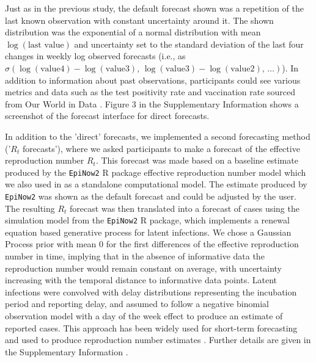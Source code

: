 \documentclass[10pt,a4paper,twocolumn]{article}
\begin{document}
Just as in the previous study, the default forecast shown was a repetition of the last known observation with constant uncertainty around it. The shown distribution was the exponential of a normal distribution with mean $\log (\text{last value})$ and uncertainty set to the standard deviation of the last four changes in weekly log observed forecasts (i.e., as $\sigma(\log(\text{value4}) - \log(\text{value3}), \, \log(\text{value3}) - \log(\text{value2}), \, \dots)$).
In addition to information about past observations, participants could see various metrics and data such as the test positivity rate and vaccination rate sourced from Our World in Data \citep{owidcoronavirus}. Figure 3 in the Supplementary Information \cite{bosseSupplementaryInformationHuman2023} shows a screenshot of the forecast interface for direct forecasts. 

In addition to the 'direct' forecasts, we implemented a second forecasting method ('$R_t$ forecasts'), where we asked participants to make a forecast of the effective reproduction number $R_t$. This forecast was made based on a baseline estimate produced by the \texttt{EpiNow2} \citep{epinow2} \textsf{R} \cite{R} package effective reproduction number model which we also used in \cite{bosseComparingHumanModelbased2022} as a standalone computational model. The estimate produced by \texttt{EpiNow2} was shown as the default forecast and could be adjusted by the user. The resulting $R_t$ forecast was then translated into a forecast of cases using the simulation model from the \texttt{EpiNow2} \textsf{R} package, which implements a renewal equation based \citep{fraserEstimatingIndividualHousehold2007} generative process for latent infections. We chose a Gaussian Process prior with mean 0 for the first differences of the effective reproduction number in time, implying that in the absence of informative data the reproduction number would remain constant on average, with uncertainty increasing with the temporal distance to informative data points. Latent infections were convolved with delay distributions representing the incubation period and reporting delay, and assumed to follow a negative binomial observation model with a day of the week effect to produce an estimate of reported cases. This approach has been widely used for short-term forecasting \cite{bosseComparingHumanModelbased2022, sherrattPredictivePerformanceMultimodel2022} and used to produce reproduction number estimates \cite{abbottEstimatingIncreaseReproduction2021, abbottEstimatingTimevaryingReproduction2020a, sherrattExploringSurveillanceData2021}. Further details are given in the Supplementary Information \cite{bosseSupplementaryInformationHuman2023}.
\end{document}
